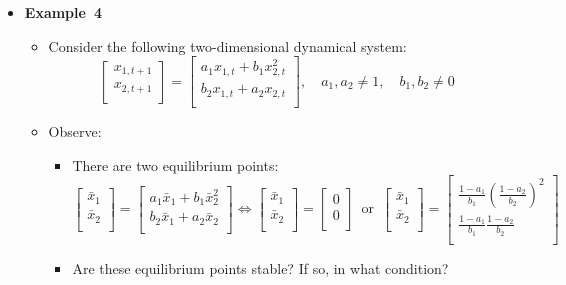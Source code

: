 \documentclass[12pt,a4paper]{article}
\begin{document}
\begin{itemize}
\item \textbf{Example~4}
  \begin{itemize}
  \item Consider the following two-dimensional dynamical system:
    \begin{equation}\label{eq:ex4}%
      \begin{bmatrix}
        x_{1,t+1} \\
        x_{2,t+1} \\
      \end{bmatrix}
      =
      \begin{bmatrix}
      a_{1} x_{1,t} + b_{1}x_{2,t}^{2} \\
      b_{2}x_{1,t} + a_{2} x_{2,t} \\
      \end{bmatrix},
      \quad a_{1},a_{2}\neq 1,
      \quad b_{1},b_{2}\neq 0
    \end{equation}
  \item Observe:
    \begin{itemize}
    \item There are two equilibrium points:
      \begin{equation}\nonumber%
      \begin{bmatrix}
        \bar{x}_{1} \\
        \bar{x}_{2} \\
      \end{bmatrix}
      =
      \begin{bmatrix}
        a_{1}\bar{x}_{1} + b_{1}\bar{x}_{2}^{2} \\
        b_{2}\bar{x}_{1} + a_{2}\bar{x}_{2} \\
      \end{bmatrix}
      \iff  
      \begin{bmatrix}
        \bar{x}_{1} \\
        \bar{x}_{2} \\
      \end{bmatrix}
      = 
      \begin{bmatrix}
        0 \\
        0 \\
      \end{bmatrix}
      \,\text{ or }\,
      \begin{bmatrix}
        \bar{x}_{1} \\
        \bar{x}_{2} \\
      \end{bmatrix}
      = 
      \begin{bmatrix}
        \frac{1-a_{1}}{b_{1}}\left(\frac{1-a_{2}}{b_{2}}\right)^{2} \\
        \frac{1-a_{1}}{b_{1}}\frac{1-a_{2}}{b_{2}} \\
      \end{bmatrix}
      \end{equation}
    \item Are these equilibrium points stable? If so, in what condition?
    \end{itemize}
  \end{itemize}

\end{itemize}
\end{document}
